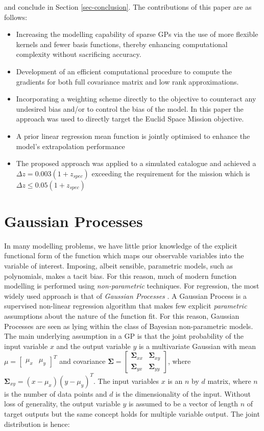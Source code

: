 \documentclass[useAMS,usenatbib,fleqn]{mn2e}
\newcommand{\bm}[1]{\mathbf{#1} }
\begin{document}
and conclude in Section \ref{sec-conclusion}. The contributions of this paper are as follows:

\begin{itemize}
  \item Increasing the modelling capability of sparse GPs via the use of more flexible kernels and fewer basis functions, thereby enhancing computational complexity without sacrificing accuracy.
  \item Development of an efficient computational procedure to compute the gradients for both full covariance matrix and low rank approximations.
  \item Incorporating a weighting scheme directly to the objective to counteract any undesired bias and/or to control the bias of the model. In this paper the approach was used to directly target the Euclid Space Mission objective.
  \item A prior linear regression mean function is jointly optimised to enhance the model's extrapolation performance
  \item The proposed approach was applied to a simulated catalogue and achieved  a $\Delta z = 0.003(1+z_{spec})$ exceeding the requirement for the mission which is $\Delta z \le 0.05(1+z_{spec})$
\end{itemize}

\section{Gaussian Processes}
\label{sec-gaussian-process}
In many modelling problems, we have little prior knowledge of the explicit functional form of the function which maps our observable variables into the variable of interest. Imposing, albeit sensible, parametric models, such as polynomials, makes a tacit bias. For this reason, much of modern function modelling is performed using \emph{non-parametric} techniques. For regression, the most widely used approach is that of \emph{Gaussian Processes} \citep{rasmussen2006gaussian}.
A Gaussian Process is a supervised non-linear regression algorithm that makes few explicit \emph{parametric} assumptions about the nature of the function fit. For this reason, Gaussian Processes are seen as lying within the class of Bayesian non-parametric models. The main underlying assumption in a GP is that the joint probability of the input variable $x$ and the output variable $y$ is a multivariate Gaussian with mean $\mu=\begin{bmatrix} \mu_{x} & \mu_{y}\end{bmatrix}^{T}$ and covariance $\bm{\Sigma}=\begin{bmatrix}\bm{\Sigma}_{xx} & \bm{\Sigma}_{xy}\\\bm{\Sigma}_{yx} & \bm{\Sigma}_{yy} \end{bmatrix}$, where $\bm{\Sigma}_{xy}=(x-\mu_{x})(y-\mu_{y})^{T}$. The input variables $x$ is an $n$ by $d$ matrix, where $n$ is the number of data points and $d$ is the dimensionality of the input. Without loss of generality, the output variable $y$ is assumed to be a vector of length $n$ of target outputs but the same concept holds for multiple variable output. The joint distribution is hence:
\end{document}
